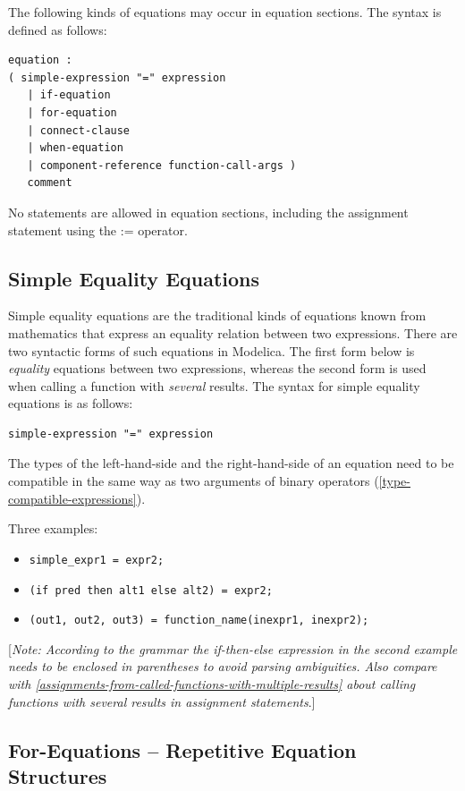 \documentclass[10pt,a4paper]{report}
\def\doublelabel#1{\label{#1}}
\begin{document}
The following kinds of equations may occur in equation sections. The
syntax is defined as follows:

\begin{lstlisting}[language=grammar]
equation :
( simple-expression "=" expression
   | if-equation
   | for-equation
   | connect-clause
   | when-equation
   | component-reference function-call-args )
   comment
\end{lstlisting}
No statements are allowed in equation sections, including the assignment
statement using the := operator.

\subsection{Simple Equality Equations}\doublelabel{simple-equality-equations}

Simple equality equations are the traditional kinds of equations known
from mathematics that express an equality relation between two
expressions. There are two syntactic forms of such equations in
Modelica. The first form below is \emph{equality} equations between two
expressions, whereas the second form is used when calling a function
with \emph{several} results. The syntax for simple equality equations is
as follows:
\begin{lstlisting}[language=grammar]
simple-expression "=" expression
\end{lstlisting}
The types of the left-hand-side and the right-hand-side of an equation
need to be compatible in the same way as two arguments of binary
operators (\ref{type-compatible-expressions}).

Three examples:

\begin{itemize}
\item \lstinline!simple_expr1 = expr2;!
\item \lstinline!(if pred then alt1 else alt2) = expr2;!
\item \lstinline!(out1, out2, out3) = function_name(inexpr1, inexpr2);!
\end{itemize}

{[}\emph{Note: According to the grammar the if-then-else expression in
the second example needs to be enclosed in parentheses to avoid parsing
ambiguities. Also compare with \ref{assignments-from-called-functions-with-multiple-results} about calling
functions with several results in assignment statements}.{]}

\subsection{For-Equations -- Repetitive Equation Structures}\doublelabel{for-equations-repetitive-equation-structures}
\end{document}
